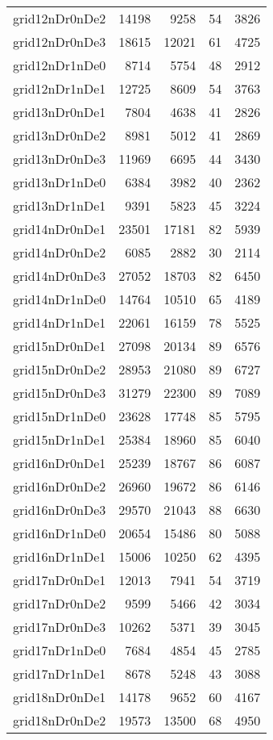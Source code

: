 \begin{longtable}{lrrrr}
grid12nDr0nDe2 & 14198 & 9258 & 54 & 3826 \\
grid12nDr0nDe3 & 18615 & 12021 & 61 & 4725 \\
grid12nDr1nDe0 & 8714 & 5754 & 48 & 2912 \\
grid12nDr1nDe1 & 12725 & 8609 & 54 & 3763 \\
grid13nDr0nDe1 & 7804 & 4638 & 41 & 2826 \\
grid13nDr0nDe2 & 8981 & 5012 & 41 & 2869 \\
grid13nDr0nDe3 & 11969 & 6695 & 44 & 3430 \\
grid13nDr1nDe0 & 6384 & 3982 & 40 & 2362 \\
grid13nDr1nDe1 & 9391 & 5823 & 45 & 3224 \\
grid14nDr0nDe1 & 23501 & 17181 & 82 & 5939 \\
grid14nDr0nDe2 & 6085 & 2882 & 30 & 2114 \\
grid14nDr0nDe3 & 27052 & 18703 & 82 & 6450 \\
grid14nDr1nDe0 & 14764 & 10510 & 65 & 4189 \\
grid14nDr1nDe1 & 22061 & 16159 & 78 & 5525 \\
grid15nDr0nDe1 & 27098 & 20134 & 89 & 6576 \\
grid15nDr0nDe2 & 28953 & 21080 & 89 & 6727 \\
grid15nDr0nDe3 & 31279 & 22300 & 89 & 7089 \\
grid15nDr1nDe0 & 23628 & 17748 & 85 & 5795 \\
grid15nDr1nDe1 & 25384 & 18960 & 85 & 6040 \\
grid16nDr0nDe1 & 25239 & 18767 & 86 & 6087 \\
grid16nDr0nDe2 & 26960 & 19672 & 86 & 6146 \\
grid16nDr0nDe3 & 29570 & 21043 & 88 & 6630 \\
grid16nDr1nDe0 & 20654 & 15486 & 80 & 5088 \\
grid16nDr1nDe1 & 15006 & 10250 & 62 & 4395 \\
grid17nDr0nDe1 & 12013 & 7941 & 54 & 3719 \\
grid17nDr0nDe2 & 9599 & 5466 & 42 & 3034 \\
grid17nDr0nDe3 & 10262 & 5371 & 39 & 3045 \\
grid17nDr1nDe0 & 7684 & 4854 & 45 & 2785 \\
grid17nDr1nDe1 & 8678 & 5248 & 43 & 3088 \\
grid18nDr0nDe1 & 14178 & 9652 & 60 & 4167 \\
grid18nDr0nDe2 & 19573 & 13500 & 68 & 4950 \\

\end{longtable}
